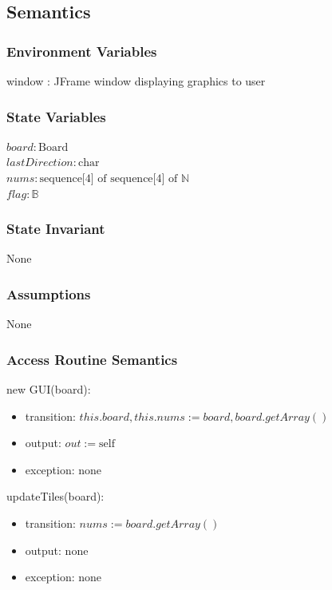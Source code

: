 \documentclass[12pt]{article}
\begin{document}
\subsection* {Semantics}

\subsubsection*{Environment Variables}
window : JFrame window displaying graphics to user

\subsubsection* {State Variables}

$\mathit{board}: \text{Board}$\\
$\mathit{lastDirection}: \text{char}$ \\
$\mathit{nums}: \text{sequence[4] of sequence[4] of } \mathbb{N}$\\
$\mathit{flag}: \mathbb{B}$

\subsubsection* {State Invariant}

None

\subsubsection* {Assumptions}

None

\subsubsection* {Access Routine Semantics}

\noindent new GUI(board):
\begin{itemize}
\item transition: $this.board, this.nums := board, board.getArray()$
\item output: $out := \mbox{self}$
\item exception: none
\end{itemize}

\noindent updateTiles(board):
\begin{itemize}
\item transition: $nums := board.getArray()$
\item output: none
\item exception: none
\end{itemize}
\end{document}

